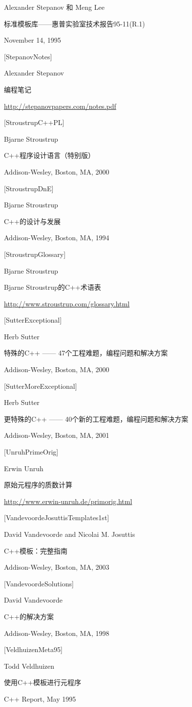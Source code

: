 Alexander Stepanov 和 Meng Lee

标准模板库——惠普实验室技术报告95-11(R.1)

November 14, 1995

{[StepanovNotes]}

Alexander Stepanov

编程笔记

\url{http://stepanovpapers.com/notes.pdf}

{[StroustrupC++PL]}

Bjarne Stroustrup

C++程序设计语言（特别版）

Addison-Wesley, Boston, MA, 2000

{[StroustrupDnE]}

Bjarne Stroustrup

C++的设计与发展

Addison-Wesley, Boston, MA, 1994

{[StroustrupGlossary]}

Bjarne Stroustrup

Bjarne Stroustrup的C++术语表

\url{http://www.stroustrup.com/glossary.html}

{[SutterExceptional]}

Herb Sutter

特殊的C++ —— 47个工程难题，编程问题和解决方案

Addison-Wesley, Boston, MA, 2000

{[SutterMoreExceptional]}

Herb Sutter

更特殊的C++ —— 40个新的工程难题，编程问题和解决方案

Addison-Wesley, Boston, MA, 2001

{[UnruhPrimeOrig]}

Erwin Unruh

原始元程序的质数计算

\url{http://www.erwin-unruh.de/primorig.html}

{[VandevoordeJosuttisTemplates1st]}

David Vandevoorde and Nicolai M. Josuttis

C++模板：完整指南

Addison-Wesley, Boston, MA, 2003

{[VandevoordeSolutions]}

David Vandevoorde

C++的解决方案

Addison-Wesley, Boston, MA, 1998

{[VeldhuizenMeta95]}

Todd Veldhuizen

使用C++模板进行元程序

C++ Report, May 1995























